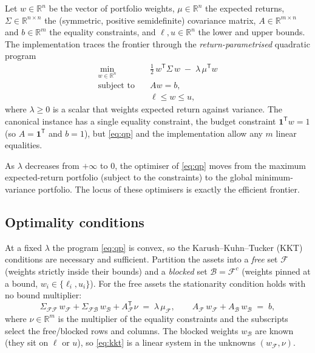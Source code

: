 \documentclass[11pt]{article}
\newcommand{\R}{\mathbb{R}}
\newcommand{\Sig}{\Sigma}
\newcommand{\F}{\mathcal{F}}        %
\newcommand{\B}{\mathcal{B}}        %
\newcommand{\lb}{\ell}              %
\newcommand{\ub}{u}                 %
\newcommand{\trans}{^{\mathsf{T}}}
\begin{document}
Let $w\in\R^n$ be the vector of portfolio weights, $\mu\in\R^n$ the expected returns,
$\Sig\in\R^{n\times n}$ the (symmetric, positive semidefinite) covariance matrix,
$A\in\R^{m\times n}$ and $b\in\R^m$ the equality constraints, and $\lb,\ub\in\R^n$ the
lower and upper bounds. The implementation traces the frontier through the
\emph{return-parametrised} quadratic program
\begin{equation}
\label{eq:qp}
\begin{aligned}
\min_{w\in\R^n}\quad & \tfrac12\, w\trans \Sig\, w \;-\; \lambda\,\mu\trans w \\
\text{subject to}\quad & A w = b, \\
& \lb \le w \le \ub,
\end{aligned}
\end{equation}
where $\lambda \ge 0$ is a scalar that weights expected return against variance. The
canonical instance has a single equality constraint, the budget constraint
$\mathbf{1}\trans w = 1$ (so $A = \mathbf{1}\trans$ and $b = 1$), but
\eqref{eq:qp} and the implementation allow any $m$ linear equalities.

As $\lambda$ decreases from $+\infty$ to $0$, the optimiser of \eqref{eq:qp} moves from
the maximum expected-return portfolio (subject to the constraints) to the global
minimum-variance portfolio. The locus of these optimisers is exactly the efficient
frontier.

\subsection{Optimality conditions}

At a fixed $\lambda$ the program \eqref{eq:qp} is convex, so the Karush--Kuhn--Tucker
(KKT) conditions are necessary and sufficient. Partition the assets into a
\emph{free} set $\F$ (weights strictly inside their bounds) and a \emph{blocked} set
$\B = \F^{c}$ (weights pinned at a bound, $w_i \in \{\lb_i,\ub_i\}$). For the free
assets the stationarity condition holds with no bound multiplier:
\begin{equation}
\label{eq:kkt}
\Sig_{\F\F}\, w_\F + \Sig_{\F\B}\, w_\B + A_\F\trans \nu \;=\; \lambda\, \mu_\F,
\qquad
A_\F\, w_\F + A_\B\, w_\B \;=\; b,
\end{equation}
where $\nu\in\R^m$ is the multiplier of the equality constraints and the subscripts
select the free/blocked rows and columns. The blocked weights $w_\B$ are known (they
sit on $\lb$ or $\ub$), so \eqref{eq:kkt} is a linear system in the unknowns
$(w_\F,\nu)$.
\end{document}
